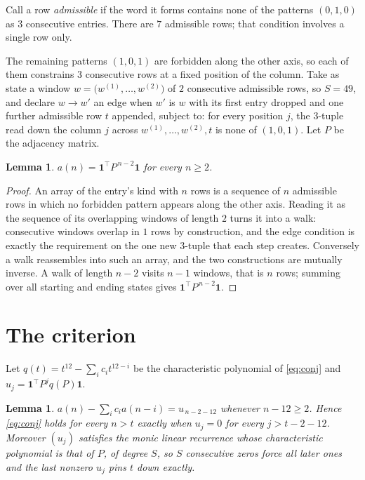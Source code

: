 \documentclass[11pt,a4paper]{article}
\theoremstyle{plain}
\newtheorem{lemma}[theorem]{Lemma}
\theoremstyle{definition}
\begin{document}
Call a row \emph{admissible} if the word it forms contains none of the patterns
$(0,1,0)$ as $3$ consecutive entries. There are $7$ admissible rows; that condition
involves a single row only.

The remaining patterns $(1,0,1)$ are forbidden along the other axis, so each of them
constrains $3$ consecutive rows at a fixed position of the column. Take as state a
window $w=\bigl(w^{(1)},\dots,w^{(2)}\bigr)$ of $2$ consecutive admissible
rows, so $S=49$, and declare $w\to w'$ an edge when $w'$ is $w$ with its first entry
dropped and one further admissible row $t$ appended, subject to: for every position
$j$, the $3$-tuple read down the column $j$ across $w^{(1)},\dots,w^{(2)},t$
is none of $(1,0,1)$. Let $P$ be the adjacency matrix.

\begin{lemma}\label{lem:walk}
$a(n)=\mathbf{1}^{\!\top}P^{\,n-2}\mathbf{1}$ for every $n\ge2$.
\end{lemma}

\begin{proof}
An array of the entry's kind with $n$ rows is a sequence of $n$ admissible rows in
which no forbidden pattern appears along the other axis. Reading it as the sequence of its
overlapping windows of length $2$ turns it into a walk: consecutive windows overlap in
$1$ rows by construction, and the edge condition is exactly the requirement on the one
new $3$-tuple that each step creates. Conversely a walk reassembles into such an array,
and the two constructions are mutually inverse. A walk of length $n-2$ visits $n-1$
windows, that is $n$ rows; summing over all starting and ending states gives
$\mathbf{1}^{\!\top}P^{\,n-2}\mathbf{1}$.
\end{proof}

\section{The criterion}

Let $q(t)=t^{12}-\sum_i c_i t^{12-i}$ be the characteristic polynomial of
\eqref{eq:conj} and $u_j=\mathbf{1}^{\!\top}P^{j}q(P)\mathbf{1}$.

\begin{lemma}\label{lem:crit}
$a(n)-\sum_i c_i a(n-i)=u_{\,n-2-12}$ whenever $n-12\ge2$. Hence
\eqref{eq:conj} holds for every $n>t$ exactly when $u_j=0$ for every
$j>t-2-12$. Moreover $(u_j)$ satisfies the monic linear recurrence whose
characteristic polynomial is that of $P$, of degree $S$, so $S$ consecutive zeros force all
later ones and the last nonzero $u_j$ pins $t$ down exactly.
\end{lemma}
\end{document}

